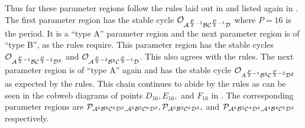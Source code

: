 Thus far these parameter regions follow the rules laid out in\hl{ }\cite{akyuz2022}\hl{ }and listed again in .
The first parameter region has the stable cycle $\mathcal{O}_{\mathcal{A}^{\frac{P}{2} - 1}\mathcal{B}\mathcal{C}^{\frac{P}{2} - 1}\mathcal{D}}$ where $P = 16$ is the period.
It is a ``type A'' parameter region and the next parameter region is of ``type B'', as the rules require.
This parameter region has the stable cycles $\mathcal{O}_{\mathcal{A}^{\frac{P}{2} - 1}\mathcal{B}\mathcal{C}^{\frac{P}{2} - 2}\mathcal{D}^2}$ and $\mathcal{O}_{\mathcal{A}^{\frac{P}{2} - 2}\mathcal{B}^2\mathcal{C}^{\frac{P}{2} - 1}\mathcal{D}}$.
This also agrees with the rules.
The next parameter region is of ``type A'' again and has the stable cycle $\mathcal{O}_{A^{\frac{P}{2} - 1}\mathcal{B}^2\mathcal{C}^{\frac{P}{2} - 2}\mathcal{D}^2}$ as expected by the rules.
This chain continues to abide by the rules as can be seen in the cobweb diagrams of points $D_{16}, E_{16},$ and $F_{16}$ in .
The corresponding parameter regions are $\mathcal{P}_{\mathcal{A}^6\mathcal{B}^2\mathcal{C}^5\mathcal{D}^3, \mathcal{A}^5\mathcal{B}^3\mathcal{C}^6\mathcal{D}^2}, \mathcal{P}_{\mathcal{A}^5\mathcal{B}^3\mathcal{C}^5\mathcal{D}^3},$ and $\mathcal{P}_{\mathcal{A}^5\mathcal{B}^3\mathcal{C}^4\mathcal{D}^4, \mathcal{A}^4\mathcal{B}^4\mathcal{C}^5\mathcal{D}^3}$ respectively.

